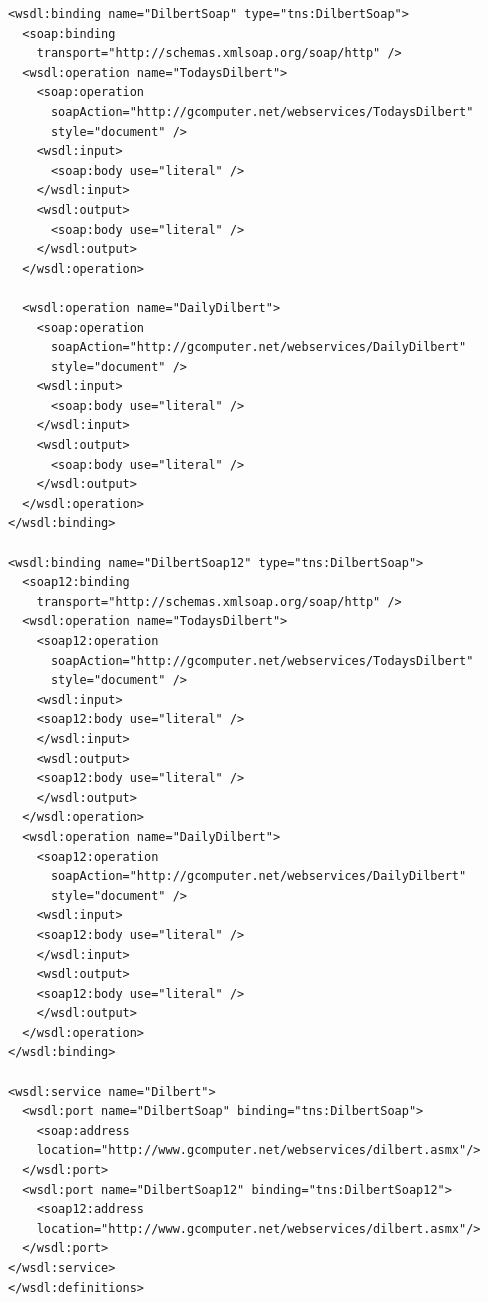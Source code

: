 \documentclass[czech,DP]{thesiskiv}
\begin{document}
\begin{lstlisting}
<wsdl:binding name="DilbertSoap" type="tns:DilbertSoap">
  <soap:binding 
    transport="http://schemas.xmlsoap.org/soap/http" />
  <wsdl:operation name="TodaysDilbert">
    <soap:operation 
      soapAction="http://gcomputer.net/webservices/TodaysDilbert" 
      style="document" />
    <wsdl:input>
      <soap:body use="literal" />
    </wsdl:input>
    <wsdl:output>
      <soap:body use="literal" />
    </wsdl:output>
  </wsdl:operation>

  <wsdl:operation name="DailyDilbert">
    <soap:operation 
      soapAction="http://gcomputer.net/webservices/DailyDilbert" 
      style="document" />
    <wsdl:input>
      <soap:body use="literal" />
    </wsdl:input>
    <wsdl:output>
      <soap:body use="literal" />
    </wsdl:output>
  </wsdl:operation>
</wsdl:binding>

<wsdl:binding name="DilbertSoap12" type="tns:DilbertSoap">
  <soap12:binding 
    transport="http://schemas.xmlsoap.org/soap/http" />
  <wsdl:operation name="TodaysDilbert">
    <soap12:operation 
      soapAction="http://gcomputer.net/webservices/TodaysDilbert" 
      style="document" />
    <wsdl:input>
    <soap12:body use="literal" />
    </wsdl:input>
    <wsdl:output>
    <soap12:body use="literal" />
    </wsdl:output>
  </wsdl:operation>
  <wsdl:operation name="DailyDilbert">
    <soap12:operation 
      soapAction="http://gcomputer.net/webservices/DailyDilbert" 
      style="document" />
    <wsdl:input>
    <soap12:body use="literal" />
    </wsdl:input>
    <wsdl:output>
    <soap12:body use="literal" />
    </wsdl:output>
  </wsdl:operation>
</wsdl:binding>

<wsdl:service name="Dilbert">
  <wsdl:port name="DilbertSoap" binding="tns:DilbertSoap">
    <soap:address 
    location="http://www.gcomputer.net/webservices/dilbert.asmx"/>
  </wsdl:port>
  <wsdl:port name="DilbertSoap12" binding="tns:DilbertSoap12">
    <soap12:address 
    location="http://www.gcomputer.net/webservices/dilbert.asmx"/>
  </wsdl:port>
</wsdl:service>
</wsdl:definitions>
\end{lstlisting}
\end{document}
